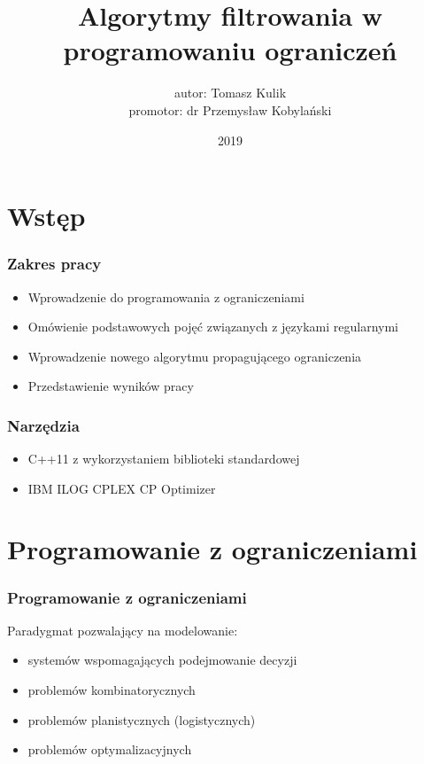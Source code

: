 \documentclass{beamer}
\title[]
{Algorytmy filtrowania w programowaniu ograniczeń}
\author[]
{
    autor: Tomasz Kulik \\
    promotor: dr Przemysław Kobylański
}
\institute[Politechnika Wrocławska]
{
  Wydział Podstawowych Problemów Techniki \\
  Politechnika Wrocławska \\
  Polska
}
\date[2019]
{2019}
\begin{document}
    \begin{frame}
        \titlepage
    \end{frame}


    \section{Wstęp}
    \begin{frame}
    	\frametitle{Zakres pracy}
        \begin{itemize}
            \item Wprowadzenie do programowania z ograniczeniami
            \item Omówienie podstawowych pojęć związanych z językami regularnymi
            \item Wprowadzenie nowego algorytmu propagującego ograniczenia
            \item Przedstawienie wyników pracy
        \end{itemize}
    \end{frame}
    \begin{frame}
    	\frametitle{Narzędzia}
        \begin{itemize}
            \item C++11 z wykorzystaniem biblioteki standardowej
            \item IBM ILOG CPLEX CP Optimizer
        \end{itemize}
    \end{frame}


    \section{Programowanie z ograniczeniami}
    \begin{frame}
        \frametitle{Programowanie z ograniczeniami}
        Paradygmat pozwalający na modelowanie:
        \begin{itemize}
            \item systemów wspomagających podejmowanie decyzji
            \item problemów kombinatorycznych
            \item problemów planistycznych (logistycznych)
            \item problemów optymalizacyjnych
        \end{itemize}
    \end{frame}
\end{document}

